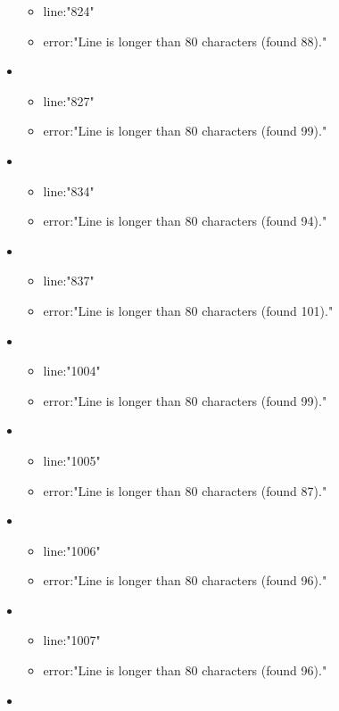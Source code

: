 \begin{itemize}
	\begin{itemize} 
		\item line:"824" 
		\item error:"Line is longer than 80 characters (found 88)." 
	\end{itemize}
	\item 
	\begin{itemize} 
		\item line:"827" 
		\item error:"Line is longer than 80 characters (found 99)." 
	\end{itemize}
	\item 
	\begin{itemize} 
		\item line:"834" 
		\item error:"Line is longer than 80 characters (found 94)." 
	\end{itemize}
	\item 
	\begin{itemize} 
		\item line:"837" 
		\item error:"Line is longer than 80 characters (found 101)." 
	\end{itemize}
	\item 
	\begin{itemize} 
		\item line:"1004" 
		\item error:"Line is longer than 80 characters (found 99)." 
	\end{itemize}
	\item 
	\begin{itemize} 
		\item line:"1005" 
		\item error:"Line is longer than 80 characters (found 87)." 
	\end{itemize}
	\item 
	\begin{itemize} 
		\item line:"1006" 
		\item error:"Line is longer than 80 characters (found 96)." 
	\end{itemize}
	\item 
	\begin{itemize} 
		\item line:"1007" 
		\item error:"Line is longer than 80 characters (found 96)." 
	\end{itemize}
	\item 
	\begin{itemize} 

\end{itemize}
\end{itemize}
